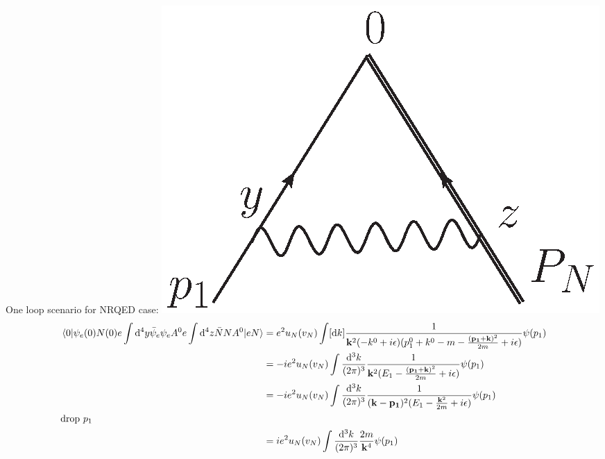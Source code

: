 \documentclass{article}
\begin{document}
 One loop scenario for NRQED case:
 \includegraphics[width=1.2 in]{OPE-1.eps}
 \begin{align*}
    \mel{0}{\psi_e(0)N(0)e\int\dd^4y\bar\psi_e\psi_e A^0e\int\dd^4z\bar NNA^0}{eN}&=e^2u_N(v_N)\int[\dd k]\frac{1}{\vb{k}^2(-k^0+i\epsilon)(p_1^0+k^0-m-\frac{\vb{(p_1+k)}^2}{2m}+i\epsilon)}\psi(p_1)\\
  &=-ie^2u_N(v_N)\int\frac{\dd^3k}{(2\pi)^3}\frac{1}{\vb{k}^2(E_1-\frac{\vb{(p_1+k)}^2}{2m}+i\epsilon)}\psi(p_1)\\
  &=-ie^2u_N(v_N)\int\frac{\dd^3k}{(2\pi)^3}\frac{1}{(\vb{k}-\vb{p_1})^2(E_1-\frac{\vb{k}^2}{2m}+i\epsilon)}\psi(p_1)\\
  \intertext{drop $p_1$}
  &=ie^2u_N(v_N)\int\frac{\dd^3k}{(2\pi)^3}\frac{2m}{\vb{k}^4}\psi(p_1)
  \end{align*}
\end{document}
